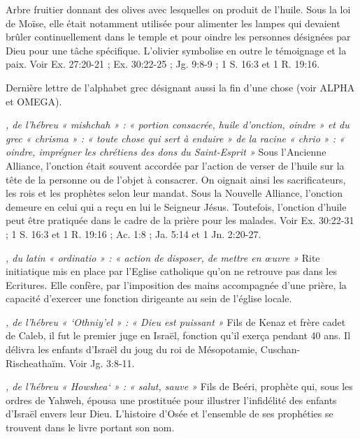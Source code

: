 \begin{multicols}{2}
\textit{}\newline
Arbre fruitier donnant des olives avec lesquelles on produit de l'huile. Sous la loi de Moïse, elle était notamment utilisée pour alimenter les lampes qui devaient brûler continuellement dans le temple et pour oindre les personnes désignées par Dieu pour une tâche spécifique. L'olivier symbolise en outre le témoignage et la paix. Voir Ex. 27:20-21 ; Ex. 30:22-25 ; Jg. 9:8-9 ; 1 S. 16:3 et 1 R. 19:16.

\textit{}\newline
Dernière lettre de l'alphabet grec désignant aussi la fin d'une chose (voir ALPHA et OMEGA).

\textit{, de l'hébreu « mishchah » : « portion consacrée, huile d'onction, oindre » et du grec « chrisma » : « toute chose qui sert à enduire » de la racine « chrio » : « oindre, imprégner les chrétiens des dons du Saint-Esprit »}\newline
Sous l'Ancienne Alliance, l'onction était souvent accordée par l'action de verser de l'huile sur la tête de la personne ou de l'objet à consacrer. On oignait ainsi les sacrificateurs, les rois et les prophètes selon leur mandat. Sous la Nouvelle Alliance, l'onction demeure en celui qui a reçu en lui le Seigneur Jésus. Toutefois, l'onction d'huile peut être pratiquée dans le cadre de la prière pour les malades. Voir Ex. 30:22-31 ; 1 S. 16:3 et 1 R. 19:16 ; Ac. 1:8 ; Ja. 5:14 et 1 Jn. 2:20-27.

\textit{, du latin « ordinatio » : « action de disposer, de mettre en œuvre »}\newline
Rite initiatique mis en place par l'Eglise catholique qu'on ne retrouve pas dans les Ecritures. Elle confère, par l'imposition des mains accompagnée d'une prière, la capacité d'exercer une fonction dirigeante au sein de l'église locale.

\textit{, de l'hébreu « `Othniy'el » : « Dieu est puissant »}\newline
Fils de Kenaz et frère cadet de Caleb, il fut le premier juge en Israël, fonction qu'il exerça pendant 40 ans. Il délivra les enfants d'Israël du joug du roi de Mésopotamie, Cuschan-Rischeathaïm. Voir Jg. 3:8-11.

\textit{, de l'hébreu « Howshea` » : « salut, sauve »}\newline
Fils de Beéri, prophète qui, sous les ordres de Yahweh, épousa une prostituée pour illustrer l'infidélité des enfants d'Israël envers leur Dieu. L'histoire d'Osée et l'ensemble de ses prophéties se trouvent dans le livre portant son nom.


\end{multicols}
